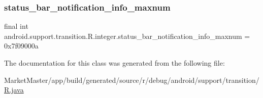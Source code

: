 \mbox{\label{classandroid_1_1support_1_1transition_1_1R_1_1integer_a16b7d2020f81686d87ad20ae20652f64}} 
\subsubsection{\texorpdfstring{status\+\_\+bar\+\_\+notification\+\_\+info\+\_\+maxnum}{status\_bar\_notification\_info\_maxnum}}
{\footnotesize\ttfamily final int android.\+support.\+transition.\+R.\+integer.\+status\+\_\+bar\+\_\+notification\+\_\+info\+\_\+maxnum = 0x7f09000a\hspace{0.3cm}{\ttfamily [static]}}



The documentation for this class was generated from the following file\+:\begin{DoxyCompactItemize}
\item 
Market\+Master/app/build/generated/source/r/debug/android/support/transition/\mbox{\hyperlink{debug_2android_2support_2transition_2R_8java}{R.\+java}}\end{DoxyCompactItemize}
